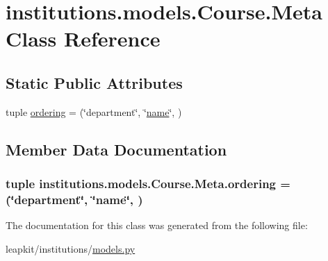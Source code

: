 \hypertarget{classinstitutions_1_1models_1_1_course_1_1_meta}{\section{institutions.\-models.\-Course.\-Meta Class Reference}
\label{classinstitutions_1_1models_1_1_course_1_1_meta}
}
\subsection*{Static Public Attributes}
\begin{DoxyCompactItemize}
\item 
tuple \hyperlink{classinstitutions_1_1models_1_1_course_1_1_meta_a97f83deddd6242318a7921b5dd6b66e9}{ordering} = (\char`\"{}department\char`\"{}, \char`\"{}\hyperlink{classinstitutions_1_1models_1_1_course_ad5ebb3105c1d4829fa8c856135aabfba}{name}\char`\"{}, )
\end{DoxyCompactItemize}


\subsection{Member Data Documentation}
\hypertarget{classinstitutions_1_1models_1_1_course_1_1_meta_a97f83deddd6242318a7921b5dd6b66e9}{
\subsubsection[{ordering}]{\setlength{\rightskip}{0pt plus 5cm}tuple institutions.\-models.\-Course.\-Meta.\-ordering = (\char`\"{}department\char`\"{}, \char`\"{}{\bf name}\char`\"{}, )\hspace{0.3cm}{\ttfamily [static]}}}\label{classinstitutions_1_1models_1_1_course_1_1_meta_a97f83deddd6242318a7921b5dd6b66e9}


The documentation for this class was generated from the following file\-:\begin{DoxyCompactItemize}
\item 
leapkit/institutions/\hyperlink{institutions_2models_8py}{models.\-py}\end{DoxyCompactItemize}
